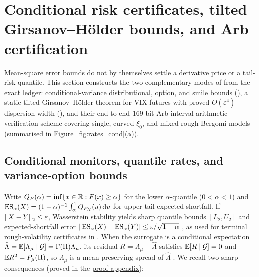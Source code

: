 \section{Conditional risk certificates, tilted Girsanov--H\"older bounds, and Arb certification}\label{sec:certificates}

Mean-square error bounds do not by themselves settle a derivative price or a tail-risk quantile. This
section constructs the two complementary modes of \RoughCert{} from the exact ledger: conditional-variance
distributional, option, and smile bounds (\RoughCertCV{}), a static tilted Girsanov--H\"older theorem for
VIX futures with proved $O(\varepsilon^4)$ dispersion width (\RoughCertTilt{}), and their end-to-end
169-bit Arb interval-arithmetic verification scheme covering single, curved-$\xi_0$, and mixed rough
Bergomi models (summarised in Figure~\ref{fig:rates_cond}(a)).

\subsection{Conditional monitors, quantile rates, and variance-option bounds}\label{sec:cond_risk}
Write $Q_F(\alpha)=\inf\{x\in\mathbb{R}:F(x)\ge\alpha\}$ for the lower $\alpha$-quantile ($0<\alpha<1$) and
$\operatorname{ES}_\alpha(X)=(1-\alpha)^{-1}\int_\alpha^1 Q_{F_X}(u)\,\mathrm{d} u$ for upper-tail expected shortfall. If
$\left\lVert X-Y\right\rVert_2\le\varepsilon$, Wasserstein stability yields sharp quantile bounds $[L_2,U_2]$
\citep{LiuMaoWangWei2022,HanLiu2026} and expected-shortfall error $|\operatorname{ES}_\alpha(X)-\operatorname{ES}_\alpha(Y)|\le\varepsilon/\sqrt{1-\alpha}$
\citep{Pichler2013,AcerbiTasche2002}, as used for terminal rough-volatility certificates in
\citet{AHMED2026111045}. When the surrogate is a conditional expectation $\hat\Lambda=\mathbb{E}[\Lambda_\mu\mid\mathcal{G}]
=\Gamma(\Pi)\Lambda_\mu$, its residual $R=\Lambda_\mu-\hat\Lambda$ satisfies $\mathbb{E}[R\mid\mathcal{G}]=0$ and
$\mathbb{E} R^2=P_\mu(\Pi)$, so $\Lambda_\mu$ is a mean-preserving spread of $\hat\Lambda$ \citep{Strassen1965}.
We recall two sharp consequences (proved in the \hyperref[app:proofs]{proof appendix}):

